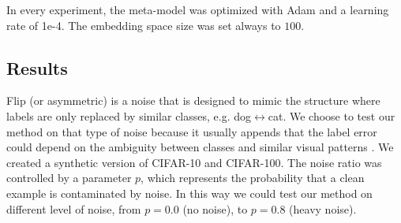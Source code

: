 \documentclass[runningheads]{llncs}
\begin{document}
	In every experiment, the meta-model was optimized with Adam and a learning rate of 1e-4. The embedding space size was set always to $100$.
	
	\subsection{Results}\label{noise}
	
		Flip (or asymmetric) is a noise that is designed to mimic the structure where labels are only replaced by similar classes, e.g. dog$\leftrightarrow$cat. We choose to test our method on that type of noise because it usually appends that the label error could depend on the ambiguity between classes and similar visual patterns \cite{xiao2015learning}. We created a synthetic version of CIFAR-10 and CIFAR-100. The noise ratio was controlled by a parameter $p$, which represents the probability that a clean example is contaminated by noise. In this way we could test our method on different level of noise, from $p = 0.0$ (no noise), to $p=0.8$ (heavy noise).
	
\end{document}
